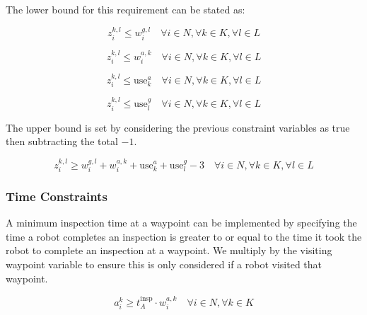 \documentclass{article}
\begin{document}
				\begin{comment}
					z_i^{k,l} = 1 if and only if (w_i^{g,l} = 1 AND w_i^{a,k} = 1 AND use_k^a = 1 AND use_l^g = 1)
				\end{comment}


				The lower bound for this requirement can be stated as:

				\begin{equation}
					z_i^{k,l} \leq w_i^{g,l} \quad \forall i \in N, \forall k \in K, \forall l \in L
				\end{equation}

				\begin{equation}
					z_i^{k,l} \leq w_i^{a,k} \quad \forall i \in N, \forall k \in K, \forall l \in L
				\end{equation}

				\begin{equation}
					z_i^{k,l} \leq \text{use}_k^a \quad \forall i \in N, \forall k \in K, \forall l \in L
				\end{equation}

				\begin{equation}
					z_i^{k,l} \leq \text{use}_l^g \quad \forall i \in N, \forall k \in K, \forall l \in L
				\end{equation}

				The upper bound is set by considering the previous constraint variables as true then subtracting the total $- 1$.

				\begin{equation}
					z_i^{k,l} \geq w_i^{g,l} + w_i^{a,k} + \text{use}_k^a + \text{use}_l^g - 3 \quad \forall i \in N, \forall k \in K, \forall l \in L
				\end{equation}


			\subsubsection{Time Constraints}

				A minimum inspection time at a waypoint can be implemented by specifying the time a robot completes an inspection is greater to or equal to the time it took the robot to complete an inspection at a waypoint.
				We multiply by the visiting waypoint variable to ensure this is only considered if a robot visited that waypoint.

				\begin{equation}
					a_i^k \geq t_A^{\text{insp}} \cdot w_i^{a,k} \quad \forall i \in N, \forall k \in K
				\end{equation}
\end{document}
